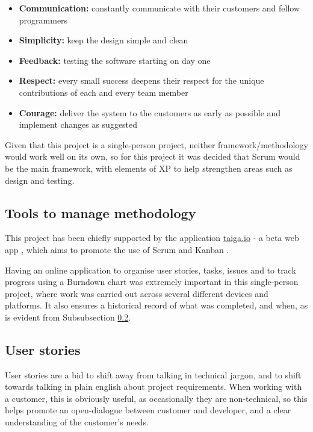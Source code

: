 \begin{itemize}
  \item \textbf{Communication: } constantly communicate with their customers and fellow programmers
  \item \textbf{Simplicity:} keep the design simple and clean
  \item \textbf{Feedback:} testing the software starting on day one
  \item \textbf{Respect: } every small success deepens their respect for the unique contributions of each and every team member
  \item \textbf{Courage: } deliver the system to the customers as early as possible and implement changes as suggested
\end{itemize}

Given that this project is a single-person project, neither framework/methodology would work well on its own, so for this project it was decided that Scrum would be the main framework, with elements of XP to help strengthen areas such as design and testing.

\subsection{Tools to manage methodology}

This project has been chiefly supported by the application \url{taiga.io} - a beta web app \cite{Taiga.io}, which aims to promote the use of Scrum and Kanban \cite{kanban}.

Having an online application to organise user stories, tasks, issues and to track progress using a Burndown chart was extremely important in this single-person project, where work was carried out across several different devices and platforms. It also ensures a historical record of what was completed, and when, as is evident from Subsubsection \ref{ssec:user-stories}.

\subsection{User stories}
\label{ssec:user-stories}

User stories are a bid to shift away from talking in technical jargon, and to shift towards talking in plain english about project requirements. When working with a customer, this is obviously useful, as occasionally they are non-technical, so this helps promote an open-dialogue between customer and developer, and a clear understanding of the customer's needs.

